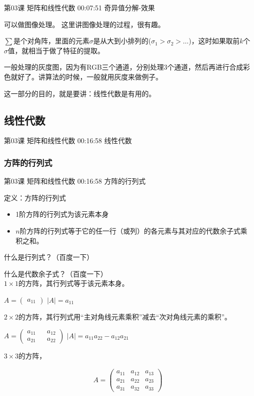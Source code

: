 \documentclass[UTF8]{ctexart}
\begin{document}
第03课 矩阵和线性代数 00:07:51 奇异值分解-效果

可以做图像处理。 这里讲图像处理的过程，很有趣。

$\sum$是个对角阵，里面的元素$\sigma$是从大到小排列的($\sigma_{1} > \sigma_{2} > \dots$)，这时如果取前$k$个$\sigma$值，就相当于做了特征的提取。

一般处理的灰度图，因为有RGB三个通道，分别处理3个通道，然后再进行合成彩色就好了。讲算法的时候，一般就用灰度来做例子。

这一部分的目的，就是要讲：线性代数是有用的。

\subsection{线性代数}

第03课 矩阵和线性代数 00:16:58 线性代数

\subsubsection{方阵的行列式}

第03课 矩阵和线性代数 00:16:58 方阵的行列式

定义：方阵的行列式

\begin{itemize}
\item 1阶方阵的行列式为该元素本身
\item $n$阶方阵的行列式等于它的任一行（或列）的各元素与其对应的代数余子式乘积之和。
\end{itemize}

什么是行列式？（百度一下）

什么是代数余子式？（百度一下）\\

$1 \times 1$的方阵，其行列式等于该元素本身。

$A=\begin{pmatrix} a_{11} \end{pmatrix}$ \quad $|A|=a_{11}$

$2 \times 2$的方阵，其行列式用“主对角线元素乘积”减去“次对角线元素的乘积”。

$A=\begin{pmatrix} a_{11} && a_{12} \\ a_{21} && a_{22} \end{pmatrix}$ \quad
$|A|=a_{11}a_{22}-a_{12}a_{21}$

$3 \times 3$的方阵，

\begin{equation}
\begin{aligned}
A=
\begin{pmatrix}
a_{11} & a_{12} & a_{13} \\
a_{21} & a_{22} & a_{23} \\
a_{31} & a_{32} & a_{33}
\end{pmatrix}
\end{aligned}
\end{equation}
\end{document}
